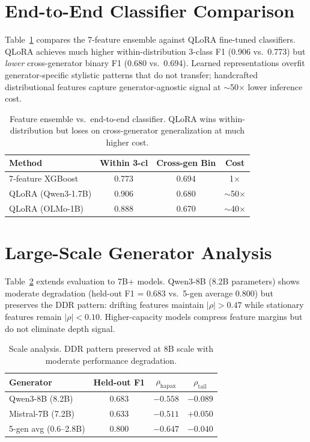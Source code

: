 \documentclass[11pt]{article}
\begin{document}
\section{End-to-End Classifier Comparison}
\label{app:e2e}

Table~\ref{tab:e2e} compares the 7-feature ensemble against QLoRA fine-tuned classifiers. QLoRA achieves much higher within-distribution 3-class F1 (0.906 vs.\ 0.773) but \emph{lower} cross-generator binary F1 (0.680 vs.\ 0.694). Learned representations overfit generator-specific stylistic patterns that do not transfer; handcrafted distributional features capture generator-agnostic signal at $\sim$50$\times$ lower inference cost.

\begin{table}[h]
\centering
\small
\begin{tabular}{lccc}
\toprule
\textbf{Method} & \textbf{Within 3-cl} & \textbf{Cross-gen Bin} & \textbf{Cost} \\
\midrule
7-feature XGBoost & 0.773 & 0.694 & 1$\times$ \\
QLoRA (Qwen3-1.7B) & 0.906 & 0.680 & $\sim$50$\times$ \\
QLoRA (OLMo-1B) & 0.888 & 0.670 & $\sim$40$\times$ \\
\bottomrule
\end{tabular}
\caption{Feature ensemble vs.\ end-to-end classifier. QLoRA wins within-distribution but loses on cross-generator generalization at much higher cost.}
\label{tab:e2e}
\end{table}

\section{Large-Scale Generator Analysis}
\label{app:scale}

Table~\ref{tab:scale} extends evaluation to 7B+ models. Qwen3-8B (8.2B parameters) shows moderate degradation (held-out F1 = 0.683 vs.\ 5-gen average 0.800) but preserves the DDR pattern: drifting features maintain $|\rho| > 0.47$ while stationary features remain $|\rho| < 0.10$. Higher-capacity models compress feature margins but do not eliminate depth signal.

\begin{table}[h]
\centering
\small
\begin{tabular}{lccc}
\toprule
\textbf{Generator} & \textbf{Held-out F1} & \textbf{$\rho_{\mathrm{hapax}}$} & \textbf{$\rho_{\mathrm{tail}}$} \\
\midrule
Qwen3-8B (8.2B) & 0.683 & $-0.558$ & $-0.089$ \\
Mistral-7B (7.2B) & 0.633 & $-0.511$ & $+0.050$ \\
5-gen avg (0.6--2.8B) & 0.800 & $-0.647$ & $-0.040$ \\
\bottomrule
\end{tabular}
\caption{Scale analysis. DDR pattern preserved at 8B scale with moderate performance degradation.}
\label{tab:scale}
\end{table}
\end{document}
